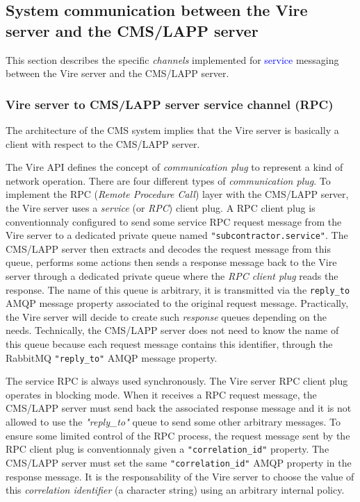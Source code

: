 
\subsection{System communication between the Vire server and the CMS/LAPP server}


This section  describes the  specific \emph{channels}  implemented for
\textcolor{blue}{service} messaging  between the  Vire server  and the
CMS/LAPP server.

\subsubsection{Vire server to CMS/LAPP server service channel (RPC)}

The architecture  of the CMS  system implies  that the Vire  server is
basically a client with respect to the CMS/LAPP server.

The  Vire API  defines  the concept  of  \emph{communication plug}  to
represent a kind of network  operation. There are four different types
of  \emph{communication plug}.   To  implement  the RPC  (\emph{Remote
  Procedure Call})  layer with  the CMS/LAPP  server, the  Vire server
uses a \emph{service} (or \emph{RPC}) client plug.
A RPC client plug is conventionnaly
configured to send some service RPC request message from the Vire server to a
dedicated  private queue  named  \texttt{"subcontractor.service"}.   The
CMS/LAPP server then extracts and  decodes the  request message  from this
queue, performs some actions then sends a response message back to the
Vire server through a dedicated private queue where the \emph{RPC client plug}
reads      the      response.       The name of this      queue
is  arbitrary, it is transmitted via the \texttt{reply\_to} AMQP message property
associated to the original request message.  Practically,  the Vire server
will decide to create such \emph{response} queues depending on the needs.
Technically, the  CMS/LAPP server  does not  need to  know the  name of
this queue because  each request  message contains  this identifier, through the
RabbitMQ \texttt{"reply\_to"} AMQP message property.

The service  RPC is  always used synchronously.   The Vire  server RPC
client plug operates in blocking mode.  When it receives a RPC request
message, the  CMS/LAPP server must  send back the  associated response
message and it is not allowed  to use the \emph{"reply\_to"} queue to send
some other arbitrary  messages.  To ensure some limited  control of the
RPC  process,  the request  message  sent  by  the RPC client  plug  is
conventionnaly  given  a   \texttt{"correlation\_id"}  property.   The
CMS/LAPP  server must  set  the  same \texttt{"correlation\_id"}  AMQP
property in  the response  message.  It is  the responsability  of the
Vire server to choose the  value of this \emph{correlation identifier}
(a character string) using an arbitrary internal policy.

